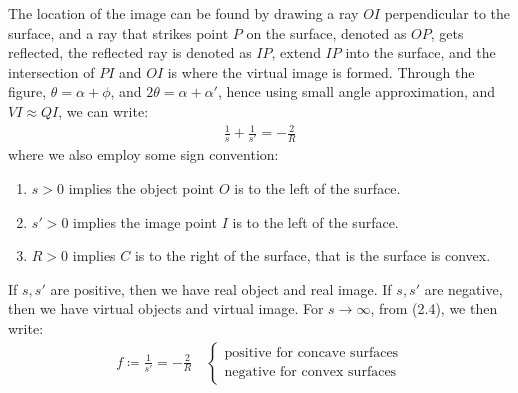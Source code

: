 \documentclass[11pt]{book}
\theoremstyle{break}
\theoremstyle{break}
\begin{document}
The location of the image can be found by drawing a ray $OI$ perpendicular to the surface, and a ray that strikes point $P$ on the surface, denoted as $OP$, gets reflected, the reflected ray is denoted as $IP$, extend $IP$ into the surface, and the intersection of $PI$ and $OI$ is where the virtual image is formed. Through the figure, $\theta = \alpha +\phi$, and $2\theta = \alpha + \alpha'$, hence using small angle approximation, and $VI \approx QI$, we can write:
\begin{align}
\frac{1}{s}+\frac{1}{s'} = -\frac{2}{R}
\end{align}
where we also employ some sign convention: \begin{enumerate}[topsep=3pt,itemsep=-1ex,partopsep=1ex,parsep=1ex]
\item $s>0$ implies the object point $O$ is to the left of the surface.
\item $s'>0$ implies the image point $I$ is to the left of the surface.
\item $R>0$ implies $C$ is to the right of the surface, that is the surface is convex.
\end{enumerate}
If $s,s'$ are positive, then we have real object and real image. If $s,s'$ are negative, then we have virtual objects and virtual image. For $s \to \infty$, from (2.4), we then write:
\begin{align}
f\coloneqq \frac{1}{s'} = -\frac{2}{R}\quad \begin{cases}  \text{positive for concave surfaces} \\ \text{negative for convex surfaces} \end{cases}
\end{align}
\end{document}
